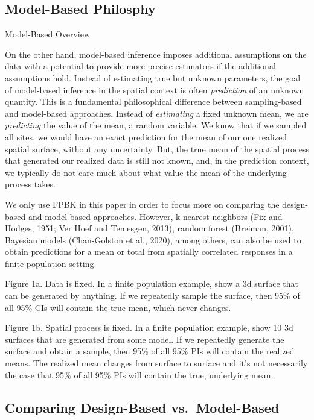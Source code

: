 \documentclass[]{elsarticle} %
\begin{document}
\hypertarget{model-based-philosphy}{%
\subsection{Model-Based Philosphy}\label{model-based-philosphy}}

Model-Based Overview

On the other hand, model-based inference imposes additional assumptions
on the data with a potential to provide more precise estimators if the
additional assumptions hold. Instead of estimating true but unknown
parameters, the goal of model-based inference in the spatial context is
often \emph{prediction} of an unknown quantity. This is a fundamental
philosophical difference between sampling-based and model-based
approaches. Instead of \emph{estimating} a fixed unknown mean, we are
\emph{predicting} the value of the mean, a random variable. We know that
if we sampled all sites, we would have an exact prediction for the mean
of our one realized spatial surface, without any uncertainty. But, the
true mean of the spatial process that generated our realized data is
still not known, and, in the prediction context, we typically do not
care much about what value the mean of the underlying process takes.

We only use FPBK in this paper in order to focus more on comparing the
design-based and model-based approaches. However, k-nearest-neighbors
(Fix and Hodges, 1951; Ver Hoef and Temesgen, 2013), random forest
(Breiman, 2001), Bayesian models (Chan-Golston et al., 2020), among
others, can also be used to obtain predictions for a mean or total from
spatially correlated responses in a finite population setting.

Figure 1a. Data is fixed. In a finite population example, show a 3d
surface that can be generated by anything. If we repeatedly sample the
surface, then 95\% of all 95\% CIs will contain the true mean, which
never changes.

Figure 1b. Spatial process is fixed. In a finite population example,
show 10 3d surfaces that are generated from some model. If we repeatedly
generate the surface and obtain a sample, then 95\% of all 95\% PIs will
contain the realized means. The realized mean changes from surface to
surface and it's not necessarily the case that 95\% of all 95\% PIs will
contain the true, underlying mean.

\hypertarget{comparing-design-based-vs.-model-based}{%
\subsection{Comparing Design-Based
vs.~Model-Based}\label{comparing-design-based-vs.-model-based}}
\end{document}
